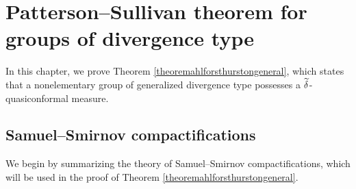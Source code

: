 %

\chapter{Patterson--Sullivan theorem for groups of divergence type}
\label{sectionahlforsthurston}

In this chapter, we prove Theorem \ref{theoremahlforsthurstongeneral}, which states that a nonelementary group of generalized divergence type possesses a $\widetilde\delta$-quasiconformal measure.

\section{Samuel--Smirnov compactifications}
We begin by summarizing the theory of Samuel--Smirnov compactifications, which will be used in the proof of Theorem \ref{theoremahlforsthurstongeneral}.


